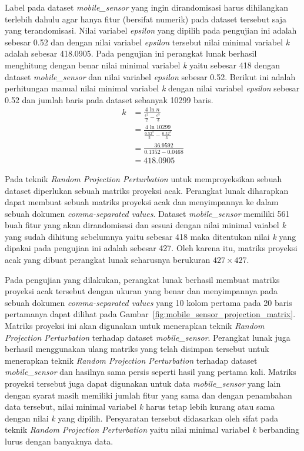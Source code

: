 Label pada dataset \textit{mobile\_sensor} yang ingin dirandomisasi harus dihilangkan terlebih dahulu agar hanya fitur (bersifat numerik) pada dataset tersebut saja yang terandomisasi. Nilai variabel \textit{epsilon} yang dipilih pada pengujian ini adalah sebesar 0.52 dan dengan nilai variabel \textit{epsilon} tersebut nilai minimal variabel \textit{k} adalah sebesar 418.0905. Pada pengujian ini perangkat lunak berhasil menghitung dengan benar nilai minimal variabel \textit{k} yaitu sebesar 418 dengan dataset \textit{mobile\_sensor} dan nilai variabel \textit{epsilon} sebesar 0.52. Berikut ini adalah perhitungan manual nilai minimal variabel \textit{k} dengan nilai variabel \textit{epsilon} sebesar 0.52 dan jumlah baris pada dataset sebanyak 10299 baris.
\begin{align*}
	k &= \frac{4\ln{n}}{\frac{\epsilon^{2}}{2}-\frac{\epsilon^{3}}{3}} \\
	&= \frac{4\ln{10299}}{\frac{0.52^{2}}{2}-\frac{0.52^{3}}{3}} \\
	&= \frac{36.9592}{0.1352-0.0468} \\
	&= 418.0905
\end{align*}

Pada teknik \textit{Random Projection Perturbation} untuk memproyeksikan sebuah dataset diperlukan sebuah matriks proyeksi acak. Perangkat lunak diharapkan dapat membuat sebuah matriks proyeksi acak dan menyimpannya ke dalam sebuah dokumen \textit{comma-separated values}. Dataset \textit{mobile\_sensor} memiliki 561 buah fitur yang akan dirandomisasi dan sesuai dengan nilai minimal vaiabel \textit{k} yang sudah dihitung sebelumnya yaitu sebesar 418 maka ditentukan nilai \textit{k} yang dipakai pada pengujian ini adalah sebesar 427. Oleh karena itu, matriks proyeksi acak yang dibuat perangkat lunak seharusnya berukuran \(427\times427\).

Pada pengujian yang dilakukan, perangkat lunak berhasil membuat matriks proyeksi acak tersebut dengan ukuran yang benar dan menyimpannya pada sebuah dokumen \textit{comma-separated values} yang 10 kolom pertama pada 20 baris pertamanya dapat dilihat pada Gambar~\ref{fig:mobile_sensor_projection_matrix}. Matriks proyeksi ini akan digunakan untuk menerapkan teknik \textit{Random Projection Perturbation} terhadap dataset \textit{mobile\_sensor}. Perangkat lunak juga berhasil menggunakan ulang matriks yang telah disimpan tersebut untuk menerapkan teknik \textit{Random Projection Perturbation} terhadap dataset \textit{mobile\_sensor} dan hasilnya sama persis seperti hasil yang pertama kali. Matriks proyeksi tersebut juga dapat digunakan untuk data \textit{mobile\_sensor} yang lain dengan syarat masih memiliki jumlah fitur yang sama dan dengan penambahan data tersebut, nilai minimal variabel \textit{k} harus tetap lebih kurang atau sama dengan nilai \textit{k} yang dipilih. Persyaratan tersebut didasarkan oleh sifat pada teknik \textit{Random Projection Perturbation} yaitu nilai minimal variabel \textit{k} berbanding lurus dengan banyaknya data.

